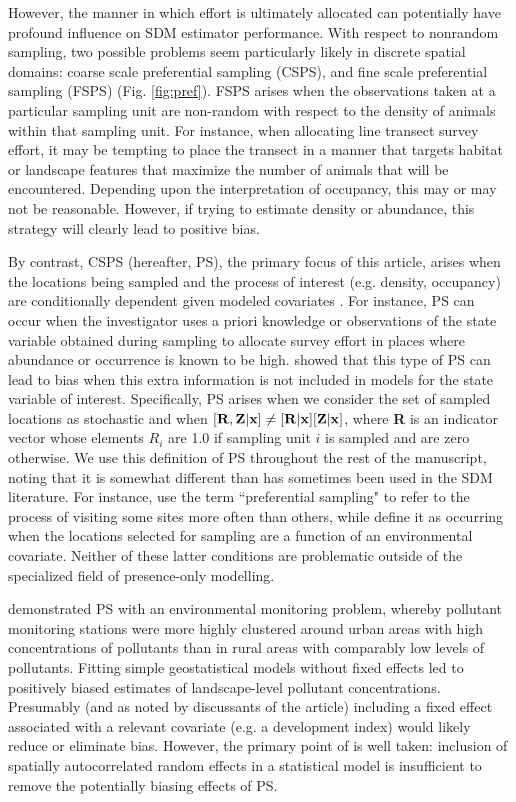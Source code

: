\documentclass[times,mee,doublespace,]{besauth2}
\begin{document}
However, the manner in which effort is ultimately allocated can potentially have profound influence on SDM estimator performance.  With respect to nonrandom sampling, two possible problems seem particularly likely in discrete spatial domains: coarse scale preferential sampling (CSPS), and fine scale preferential sampling (FSPS) (Fig. \ref{fig:pref}).  FSPS arises when the observations taken at a  particular sampling unit are non-random with respect to the density of animals within that sampling unit.  For instance, when allocating line transect survey effort, it may be tempting to place the transect in a manner that targets habitat or landscape features that maximize the number of animals that will be encountered.  Depending upon the interpretation of occupancy, this may or may not be reasonable.  However, if trying to estimate density or abundance, this strategy will clearly lead to positive bias.

By contrast, CSPS (hereafter, PS), the primary focus of this article, arises when the locations being sampled and the process of interest (e.g. density, occupancy) are conditionally dependent given modeled covariates \citep{DiggleEtAl2010}.  For instance, PS can occur when the investigator uses a priori knowledge or observations of the state variable obtained during sampling to allocate survey effort in places where abundance or occurrence is known to be high. \citet{DiggleEtAl2010} showed that this type of PS can lead to bias when this extra information is not included in models for the state variable of interest.  Specifically, PS arises when we consider the set of sampled locations as stochastic and when $[{\bf R},{\bf Z} | {\bf x}] \neq [{\bf R}|{\bf x}][{\bf Z}|{\bf x}]$, where \textbf{R} is an indicator vector whose elements $R_i$ are 1.0 if sampling unit $i$ is sampled and are zero otherwise.  We use this definition of PS throughout the rest of the manuscript, noting that it is somewhat different than has sometimes been used in the SDM literature.  For instance, \citet{MerckxEtAl2011} use the term ``preferential sampling" to refer to the process of visiting some sites more often than others, while \citet{ManceurKuhn2014} define it as occurring when the locations selected for sampling are a function of an environmental covariate.  Neither of these latter conditions are problematic outside of the specialized field of presence-only modelling.

\citet{DiggleEtAl2010} demonstrated PS with an environmental monitoring problem, whereby pollutant monitoring stations were more highly clustered around urban areas with high concentrations of pollutants than in rural areas with comparably low levels of pollutants.  Fitting simple geostatistical models without fixed effects led to positively biased estimates of landscape-level pollutant concentrations.  Presumably (and as noted by discussants of the article) including a fixed effect associated with a relevant covariate (e.g. a development index) would likely reduce or eliminate bias.  However, the primary point of \citet{DiggleEtAl2010} is well taken: inclusion of spatially autocorrelated random effects in a statistical model is insufficient to remove the potentially biasing effects of PS.
\end{document}
